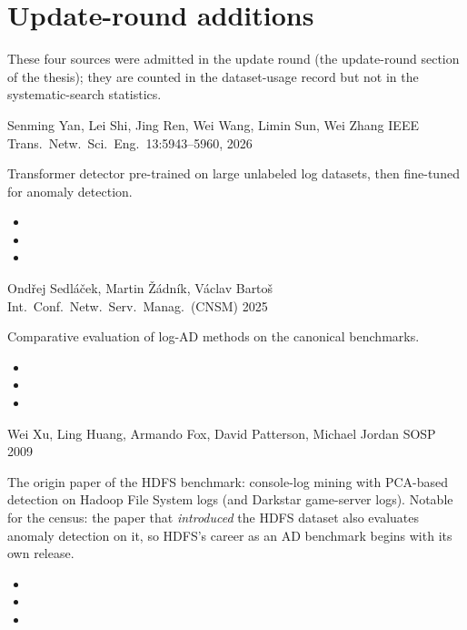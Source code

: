 \section{Update-round additions}
These four sources were admitted in the update round (the update-round section of the thesis); they are counted in the dataset-usage record but not in the systematic-search statistics.

{Senming Yan, Lei Shi, Jing Ren, Wei Wang, Limin Sun, Wei Zhang}
{IEEE Trans.\ Netw.\ Sci.\ Eng.\ 13:5943--5960, 2026}
{Transformer detector pre-trained on large unlabeled log datasets, then
fine-tuned for anomaly detection.
\begin{itemize}[nosep]
  \item {}
  \item {}
  \item {}
\end{itemize}}

{Ond\v{r}ej Sedl\'a\v{c}ek, Martin \v{Z}\'adn\'ik, V\'aclav Barto\v{s}}
{Int.\ Conf.\ Netw.\ Serv.\ Manag.\ (CNSM) 2025}
{Comparative evaluation of log-AD methods on the canonical benchmarks.
\begin{itemize}[nosep]
  \item {}
  \item {}
  \item {}
\end{itemize}}

{Wei Xu, Ling Huang, Armando Fox, David Patterson, Michael Jordan}
{SOSP 2009}
{The origin paper of the HDFS benchmark: console-log mining with
PCA-based detection on Hadoop File System logs (and Darkstar game-server
logs). Notable for the census: the paper that \emph{introduced} the
HDFS dataset also evaluates anomaly detection on it, so HDFS's career as
an AD benchmark begins with its own release.
\begin{itemize}[nosep]
  \item {}
  \item {}
  \item {}
\end{itemize}}

